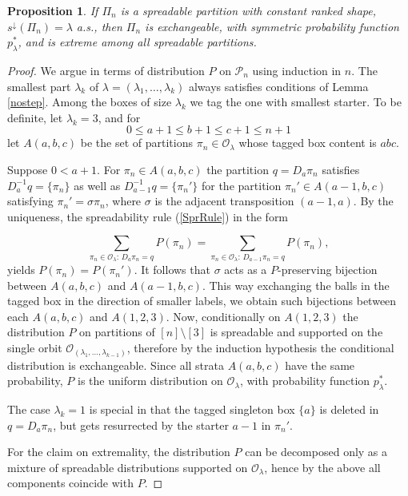 \documentclass{article}
\newtheorem{proposition}{Proposition}
\begin{document}
\begin{proposition}\label{SingleOrbit}
 If $\Pi_n$ is a spreadable partition with constant ranked shape,
$s^\downarrow(\Pi_n)=\lambda$ a.s.,
 then $\Pi_n$ is  exchangeable, with symmetric probability function $p^*_\lambda$, and is extreme among all
spreadable partitions.
\end{proposition}
\begin{proof} We argue in terms of distribution $P$ on ${\mathcal P}_n$ using induction in $n$. The smallest part  $\lambda_k$ of $\lambda=(\lambda_1,\ldots,\lambda_k)$ always satisfies conditions of Lemma \ref{nostep}. 
Among the boxes of size  $\lambda_k$ we tag the one with smallest starter. To be definite, let $\lambda_k=3$, and for 
$$0\leq a+1\leq b+1\leq c+1\leq n+1$$
let $A(a,b,c)$ be the set of partitions $\pi_n\in {\mathcal O}_\lambda$ whose tagged box content is $abc$.


Suppose $0<a+1$.  For $\pi_n\in A(a,b,c)$ the partition $q=D_a \pi_n$ satisfies   $D_a^{-1}q=\{\pi_n\}$ as well as   $D_{a-1}^{-1}q=\{\pi_n'\}$ for  the partition $\pi_n'\in A(a-1,b,c)$ satisfying 
$\pi_n'= \sigma \pi_n$, where $\sigma$ is the adjacent transposition $(a-1, a)$.
By the uniqueness, the spreadability rule (\ref{SprRule}) in the form

\begin{equation}\nonumber
\sum_{\pi_n\in{\mathcal O}_\lambda :\,D_a\pi_n=q} P(\pi_n)
=
\sum_{\pi_n\in{\mathcal O}_\lambda:\,D_{a-1}\pi_n=q} P(\pi_n),
\end{equation}
 yields $P(\pi_n)=P(\pi_n')$.
It follows that $\sigma$ acts as a $P$-preserving bijection between $A(a,b,c)$ and $A(a-1,b,c)$.  This way exchanging the balls in the tagged box in the direction of smaller labels,
we obtain such bijections between each $A(a,b,c)$ and $A(1,2,3)$. Now, conditionally on $A(1,2,3)$ the distribution $P$ on partitions of $[n]\setminus[3]$ is spreadable and supported
on the single orbit ${\mathcal O}_{(\lambda_1,\ldots,\lambda_{k-1})}$, therefore by the induction hypothesis the conditional distribution is exchangeable.
Since all strata $A(a,b,c)$ have the same probability, $P$ is the uniform distribution on ${\mathcal O}_\lambda$, with probability function $p^*_\lambda$.

The case $\lambda_k=1$ is special in that the tagged singleton box $\{a\}$ is deleted in $q=D_a\pi_n$, but gets resurrected by the starter $a-1$   in $\pi_n'$. 

For the  claim on extremality,
the distribution $P$ can be decomposed only as a mixture of spreadable distributions supported on ${\mathcal O}_\lambda$, hence by the above all components coincide with $P$.
\end{proof}
\end{document}
